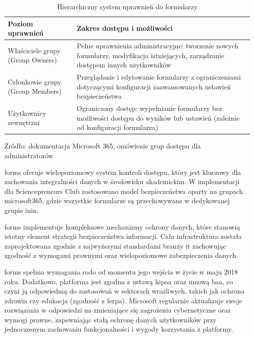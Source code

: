 \begin{table}[ht]
\centering
\caption[Hierarchiczny system uprawnień do formularzy, źródło: dokumentacja Microsoft 365, omówienie grup dostępu dla administratorów \cite{Microsoft365Groups2025}]{Hierarchiczny system uprawnień do formularzy}
\renewcommand{\arraystretch}{1.3} %
\begin{tabular}{| >{\raggedright\arraybackslash}p{} | >{\raggedright\arraybackslash}p{} |}
\hline
\textbf{Poziom uprawnień} & \textbf{Zakres dostępu i możliwości} \\
\hline
Właściciele grupy (Group Owners) & Pełne uprawnienia administracyjne: tworzenie nowych formularzy, modyfikacja istniejących, zarządzanie dostępem innych użytkowników \\
\hline
Członkowie grupy (Group Members) & Przeglądanie i edytowanie formularzy z ograniczeniami dotyczącymi konfiguracji zaawansowanych ustawień bezpieczeństwa \\
\hline
Użytkownicy zewnętrzni & Ograniczony dostęp: wypełnianie formularzy bez możliwości dostępu do wyników lub ustawień (zależnie od konfiguracji formularza) \\
\hline
\end{tabular}
\vspace{0.5em}
\par\raggedright\footnotesize{Źródło: dokumentacja Microsoft 365, omówienie grup dostępu dla administratorów \cite{Microsoft365Groups2025}}
\end{table}

\gls{forms} oferuje wielopoziomowy system kontroli dostępu, który jest kluczowy dla zachowania integralności danych w środowisku akademickim. W implementacji dla Sciencepreneurs Club zastosowano model bezpieczeństwa oparty na grupach \gls{microsoft365}, gdzie wszystkie formularze są przechowywane w dedykowanej grupie \gls{inin}.

\gls{forms} implementuje kompleksowe mechanizmy ochrony danych, które stanowią istotny element strategii bezpieczeństwa informacji. Cała infrastruktura została zaprojektowana zgodnie z najwyższymi standardami branży \gls{it} zachowując zgodność z wymogami prawnymi oraz wielopoziomowe zabezpieczenia danych. 

\gls{forms} spełnia wymagania \gls{rodo} od momentu jego wejścia w życie w maju 2018 roku. Dodatkowo, platforma jest zgodna z ustawą \gls{hipaa} oraz umową \gls{baa}, co czyni ją odpowiednią do zastosowań w sektorach wrażliwych, takich jak ochrona zdrowia czy edukacja (zgodność z \gls{ferpa}). \cite{microsoft_forms_privacy_2024} Microsoft regularnie aktualizuje swoje rozwiązania w odpowiedzi na zmieniające się zagrożenia cybernetyczne oraz wymogi prawne, zapewniając stałą ochronę danych użytkowników przy jednoczesnym zachowaniu funkcjonalności i wygody korzystania z platformy.

